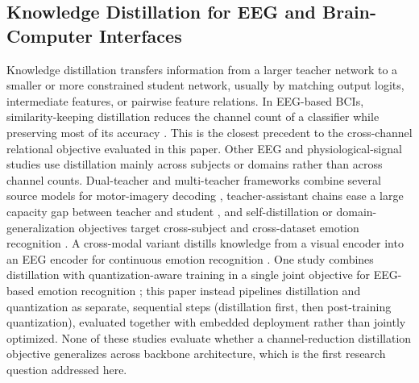 \documentclass[11pt,a4paper,twoside,asymmetric]{article}
\begin{document}
\subsection{Knowledge Distillation for EEG and Brain-Computer Interfaces}
Knowledge distillation transfers information from a larger teacher network to a smaller or more constrained student network, usually by matching output logits, intermediate features, or pairwise feature relations. In EEG-based BCIs, similarity-keeping distillation reduces the channel count of a classifier while preserving most of its accuracy \cite{R47}. This is the closest precedent to the cross-channel relational objective evaluated in this paper. Other EEG and physiological-signal studies use distillation mainly across subjects or domains rather than across channel counts. Dual-teacher and multi-teacher frameworks combine several source models for motor-imagery decoding \cite{R49,R54}, teacher-assistant chains ease a large capacity gap between teacher and student \cite{R53}, and self-distillation or domain-generalization objectives target cross-subject and cross-dataset emotion recognition \cite{R50,R52,R55,R57}. A cross-modal variant distills knowledge from a visual encoder into an EEG encoder for continuous emotion recognition \cite{R51}. One study combines distillation with quantization-aware training in a single joint objective for EEG-based emotion recognition \cite{R56}; this paper instead pipelines distillation and quantization as separate, sequential steps (distillation first, then post-training quantization), evaluated together with embedded deployment rather than jointly optimized. None of these studies evaluate whether a channel-reduction distillation objective generalizes across backbone architecture, which is the first research question addressed here.
\end{document}

